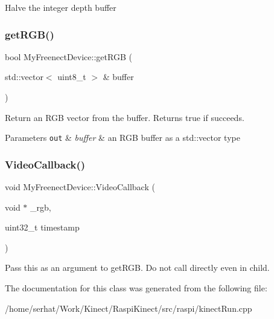 Halve the integer depth buffer \hypertarget{class_my_freenect_device_afead2e01130913c50376e3439036aed8}{}\label{class_my_freenect_device_afead2e01130913c50376e3439036aed8} 
\subsubsection{\texorpdfstring{get\+R\+G\+B()}{getRGB()}}
{\footnotesize\ttfamily bool My\+Freenect\+Device\+::get\+R\+GB (\begin{DoxyParamCaption}\item[{std\+::vector$<$ uint8\+\_\+t $>$ \&}]{buffer }\end{DoxyParamCaption})\hspace{0.3cm}{\ttfamily [inline]}}

Return an R\+GB vector from the buffer. Returns true if succeeds. 
\begin{DoxyParams}[1]{Parameters}
\mbox{\tt out}  & {\em buffer} & an R\+GB buffer as a std\+::vector type \\
\hline
\end{DoxyParams}
\hypertarget{class_my_freenect_device_adbe3befb3e1548044b747b25a2adc126}{}\label{class_my_freenect_device_adbe3befb3e1548044b747b25a2adc126} 
\subsubsection{\texorpdfstring{Video\+Callback()}{VideoCallback()}}
{\footnotesize\ttfamily void My\+Freenect\+Device\+::\+Video\+Callback (\begin{DoxyParamCaption}\item[{void $\ast$}]{\+\_\+rgb,  }\item[{uint32\+\_\+t}]{timestamp }\end{DoxyParamCaption})\hspace{0.3cm}{\ttfamily [inline]}}

Pass this as an argument to get\+R\+GB. Do not call directly even in child. 

The documentation for this class was generated from the following file\+:\begin{DoxyCompactItemize}
\item 
/home/serhat/\+Work/\+Kinect/\+Raspi\+Kinect/src/raspi/kinect\+Run.\+cpp\end{DoxyCompactItemize}
